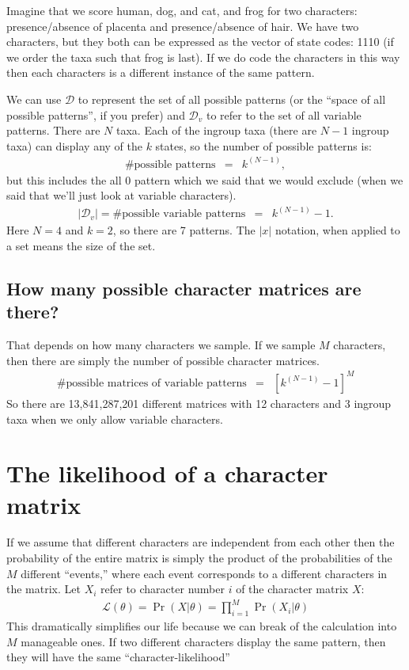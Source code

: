 \documentclass[11pt]{article}
\newcommand{\patternSpace}{\ensuremath{\mathcal{D}}}
\newcommand{\variablePatternSpace}{\ensuremath{\mathcal{D}_v}}
\begin{document}
Imagine that we score human, dog, and cat, and frog for two characters: presence/absence of placenta and presence/absence of hair.
We have two characters, but they both can be expressed as the vector of state codes: 1110  (if we order the taxa such that frog is last).  
If we do code the characters in this way then each characters is a different instance of the same pattern.

We can use $\patternSpace$ to represent the set of all possible patterns (or the ``space of all possible patterns'', if you prefer) and $\variablePatternSpace$ to refer to the set of all variable patterns.
There are $N$ taxa.
Each of the ingroup taxa  (there are $N-1$ ingroup taxa) can display any of the $k$ states, so the number of possible patterns is:
\begin{eqnarray}
	\#\mbox{possible patterns} & = & k^{(N-1)},
\end{eqnarray}
but this includes the all 0 pattern which we said that we would exclude (when we said that we'll just look at variable characters).
\begin{eqnarray}\label{numVarPatterns}
	|\variablePatternSpace| = \#\mbox{possible variable patterns}& = & k^{(N-1)} - 1.
\end{eqnarray}
Here $N=4$ and $k=2$, so there are 7 patterns.
The $|x|$ notation, when applied to a set means the size of the set.

\subsection*{How many possible character matrices are there?} 
That depends on how many characters we sample.
If we sample $M$ characters, then there are simply the number of 
possible character matrices.
\begin{eqnarray}
	\#\mbox{possible matrices of variable patterns} & = & [k^{(N-1)} - 1]^M
\end{eqnarray}
So there are 13,841,287,201 different matrices with 12 characters and 3 ingroup taxa when
we only allow variable characters.

\section*{The likelihood of a character matrix}
If we assume that different characters are independent from each other then 
the probability of the entire matrix is simply the product
of the probabilities of the $M$ different ``events,'' where each event corresponds to
a different characters in the matrix.
Let $X_i$ refer to character number $i$ of the character matrix $X$:
\begin{eqnarray}\label{indepChar}
	\mathcal{L}(\theta) = \Pr(X|\theta) = \prod_{i=1}^{M}\Pr(X_i|\theta)
\end{eqnarray}
This dramatically simplifies our life because we can break of the calculation into $M$ manageable ones.
If two different characters display the same pattern, then they will have the same ``character-likelihood''
\end{document}
